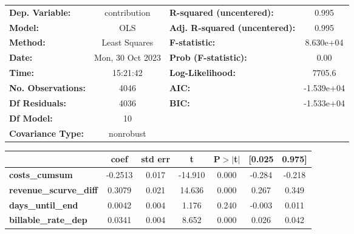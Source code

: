 \begin{center}
\begin{tabular}{lclc}
\toprule
\textbf{Dep. Variable:}                &   contribution   & \textbf{  R-squared (uncentered):}      &     0.995   \\
\textbf{Model:}                        &       OLS        & \textbf{  Adj. R-squared (uncentered):} &     0.995   \\
\textbf{Method:}                       &  Least Squares   & \textbf{  F-statistic:       }          & 8.630e+04   \\
\textbf{Date:}                         & Mon, 30 Oct 2023 & \textbf{  Prob (F-statistic):}          &     0.00    \\
\textbf{Time:}                         &     15:21:42     & \textbf{  Log-Likelihood:    }          &    7705.6   \\
\textbf{No. Observations:}             &        4046      & \textbf{  AIC:               }          & -1.539e+04  \\
\textbf{Df Residuals:}                 &        4036      & \textbf{  BIC:               }          & -1.533e+04  \\
\textbf{Df Model:}                     &          10      & \textbf{                     }          &             \\
\textbf{Covariance Type:}              &    nonrobust     & \textbf{                     }          &             \\
\bottomrule
\end{tabular}
\begin{tabular}{lcccccc}
                                       & \textbf{coef} & \textbf{std err} & \textbf{t} & \textbf{P$> |$t$|$} & \textbf{[0.025} & \textbf{0.975]}  \\
\midrule
\textbf{costs\_cumsum}                 &      -0.2513  &        0.017     &   -14.910  &         0.000        &       -0.284    &       -0.218     \\
\textbf{revenue\_scurve\_diff}         &       0.3079  &        0.021     &    14.636  &         0.000        &        0.267    &        0.349     \\
\textbf{days\_until\_end}              &       0.0042  &        0.004     &     1.176  &         0.240        &       -0.003    &        0.011     \\
\textbf{billable\_rate\_dep}           &       0.0341  &        0.004     &     8.652  &         0.000        &        0.026    &        0.042     \\

\end{tabular}
\end{center}
